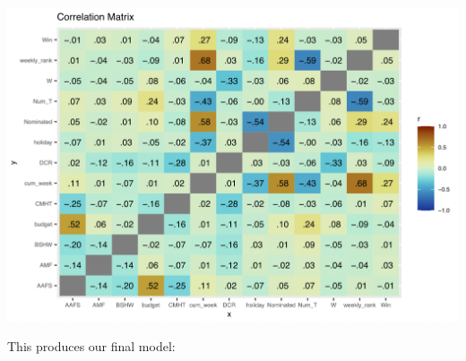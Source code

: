 \documentclass[11pt]{article} %
\begin{document}
\begin{center}
    \includegraphics[scale = 0.5]{Correlation Matrix.png}
\end{center}

This produces our final model: 
\end{document}
